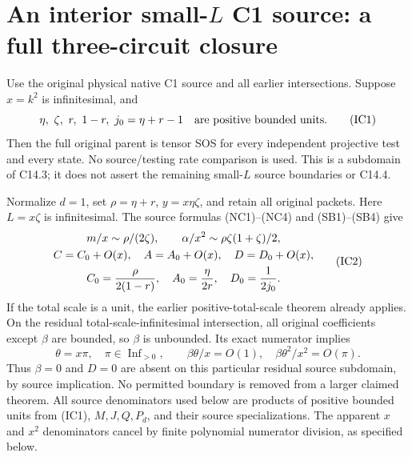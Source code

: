 \section[An interior small-L C1 source: a full three-circuit closure]{An interior small-$L$ C1 source: a full three-circuit closure}
\label{sec:r9-c1-small-interior}

\begin{theorem}
Use the original physical native C1 source and all earlier intersections.
Suppose $x=k^2$ is infinitesimal, and
\[
 \eta,\ \zeta,\ r,\ 1-r,\ j_0=\eta+r-1
       \quad\hbox{are positive bounded units}.                 \tag{IC1}
\]
Then the full original parent is tensor SOS for every independent
projective test and every state. No source/testing rate comparison is
used. This is a subdomain of C14.3; it does not assert the remaining
small-$L$ source boundaries or C14.4.
\end{theorem}

Normalize $d=1$, set $\rho=\eta+r$, $y=x\eta\zeta$, and retain
all original packets. Here $L=x\zeta$ is infinitesimal. The source
formulas (NC1)--(NC4) and (SB1)--(SB4) give
\[
 \begin{gathered}
 m/x\sim\rho/(2\zeta),\qquad
 \alpha/x^2\sim\rho\zeta(1+\zeta)/2,\\
 C=C_0+O(x),\quad A=A_0+O(x),\quad D=D_0+O(x),\\
 C_0={\rho\over2(1-r)},\quad A_0={\eta\over2r},
 \quad D_0={1\over2j_0}.                                \end{gathered} \tag{IC2}
\]
If the total scale is a unit, the earlier positive-total-scale theorem
already applies. On the residual total-scale-infinitesimal intersection,
all original coefficients except $\beta$ are bounded, so $\beta$ is
unbounded. Its exact numerator implies
\[
 \theta=x\pi,\quad\pi\in\operatorname{Inf}_{>0},\qquad
 \beta\theta/x=O(1),\quad
 \beta\theta^2/x^2=O(\pi).                               \tag{IC3}
\]
Thus $\beta=0$ and $D=0$ are absent on this particular residual source
subdomain, by source implication. No permitted boundary is removed
from a larger claimed theorem. All source denominators used below are
products of positive bounded units from (IC1), $M,J,Q,P_d$, and their
source specializations. The apparent $x$ and $x^2$ denominators cancel
by finite polynomial numerator division, as specified below.

